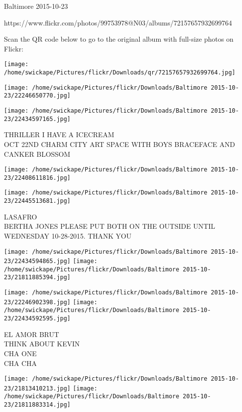 \documentclass[10pt,letterpaper]{article}
\begin{document}
Baltimore 2015-10-23

https://www.flickr.com/photos/99753978@N03/albums/72157657932699764

Scan the QR code below to go to the original album with full-size photos on Flickr:

\texttt{[image: /home/swickape/Pictures/flickr/Downloads/qr/72157657932699764.jpg]}
\pagebreak

\texttt{[image: /home/swickape/Pictures/flickr/Downloads/Baltimore 2015-10-23/22246650770.jpg]}

\vspace{0.25in}
\texttt{[image: /home/swickape/Pictures/flickr/Downloads/Baltimore 2015-10-23/22434597165.jpg]}

THRILLER I HAVE A ICECREAM\\
OCT 22ND CHARM CITY ART SPACE WITH BOYS BRACEFACE AND CANKER BLOSSOM\\
\pagebreak

\texttt{[image: /home/swickape/Pictures/flickr/Downloads/Baltimore 2015-10-23/22408611816.jpg]}

\vspace{0.25in}
\texttt{[image: /home/swickape/Pictures/flickr/Downloads/Baltimore 2015-10-23/22445513681.jpg]}

LASAFRO\\
BERTHA JONES PLEASE PUT BOTH ON THE OUTSIDE UNTIL WEDNESDAY 10{-}28{-}2015.  THANK YOU\\
\pagebreak

\texttt{[image: /home/swickape/Pictures/flickr/Downloads/Baltimore 2015-10-23/22434594865.jpg]}
\texttt{[image: /home/swickape/Pictures/flickr/Downloads/Baltimore 2015-10-23/21811885394.jpg]}

\texttt{[image: /home/swickape/Pictures/flickr/Downloads/Baltimore 2015-10-23/22246902398.jpg]}
\texttt{[image: /home/swickape/Pictures/flickr/Downloads/Baltimore 2015-10-23/22434592595.jpg]}

EL AMOR BRUT\\
THINK ABOUT KEVIN\\
CHA ONE\\
CHA CHA\\
\pagebreak

\texttt{[image: /home/swickape/Pictures/flickr/Downloads/Baltimore 2015-10-23/21813410213.jpg]}
\texttt{[image: /home/swickape/Pictures/flickr/Downloads/Baltimore 2015-10-23/21811883314.jpg]}
\end{document}
